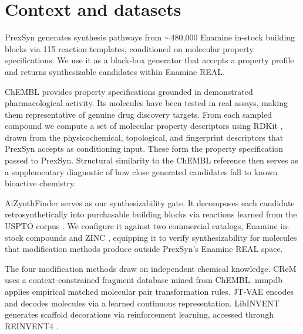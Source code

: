 \section*{Context and datasets}

PrexSyn \cite{bib2} generates synthesis pathways from $\sim$480,000 Enamine in-stock building blocks via 115 reaction templates, conditioned on molecular property specifications. We use it as a black-box generator that accepts a property profile and returns synthesizable candidates within Enamine REAL.

ChEMBL \cite{bib4} provides property specifications grounded in demonstrated pharmacological activity. Its molecules have been tested in real assays, making them representative of genuine drug discovery targets. From each sampled compound we compute a set of molecular property descriptors using RDKit \cite{bib18}, drawn from the physicochemical, topological, and fingerprint descriptors that PrexSyn accepts as conditioning input. These form the property specification passed to PrexSyn. Structural similarity to the ChEMBL reference then serves as a supplementary diagnostic of how close generated candidates fall to known bioactive chemistry.

AiZynthFinder \cite{bib5} serves as our synthesizability gate. It decomposes each candidate retrosynthetically into purchasable building blocks via reactions learned from the USPTO corpus \cite{bib6}. We configure it against two commercial catalogs, Enamine in-stock compounds and ZINC \cite{bib17}, equipping it to verify synthesizability for molecules that modification methods produce outside PrexSyn's Enamine REAL space.

The four modification methods draw on independent chemical knowledge. CReM \cite{bib7} uses a context-constrained fragment database mined from ChEMBL. mmpdb \cite{bib8} applies empirical matched molecular pair transformation rules. JT-VAE \cite{bib9} encodes and decodes molecules via a learned continuous representation. LibINVENT \cite{bib10} generates scaffold decorations via reinforcement learning, accessed through REINVENT4 \cite{bib11}.
